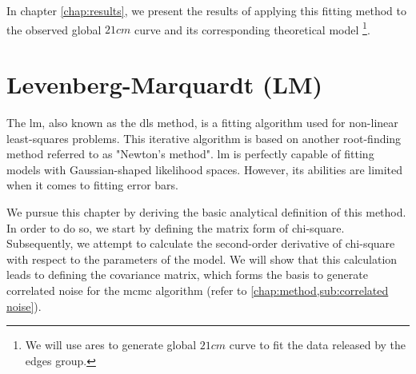 \documentclass[12pt, TexShade, letterpaper]{report}
\begin{document}
In chapter \ref{chap:results}, we present the results of applying this fitting method to the observed global $21cm$ curve and its corresponding theoretical model \footnote{We will use \gls{ares} to generate global $21cm$ curve to fit the data released by the \gls{edges} group.}.\par
\section{Levenberg-Marquardt (LM)}
\label{chap:method,sub:LM}
The \gls{lm}, also known as the \gls{dls} method, is a fitting algorithm used for non-linear least-squares problems. This iterative algorithm is based on another root-finding method referred to as "Newton's method". \gls{lm} is perfectly capable of fitting models with Gaussian-shaped likelihood spaces. However, its abilities are limited when it comes to fitting error bars.\par
We pursue this chapter by deriving the basic analytical definition of this method. In order to do so, we start by defining the matrix form of chi-square. Subsequently, we attempt to calculate the second-order derivative of chi-square with respect to the parameters of the model. We will show that this calculation leads to defining the covariance matrix, which forms the basis to generate correlated noise for the \gls{mcmc} algorithm (refer to \ref{chap:method,sub:correlated noise}).\par
\end{document}

